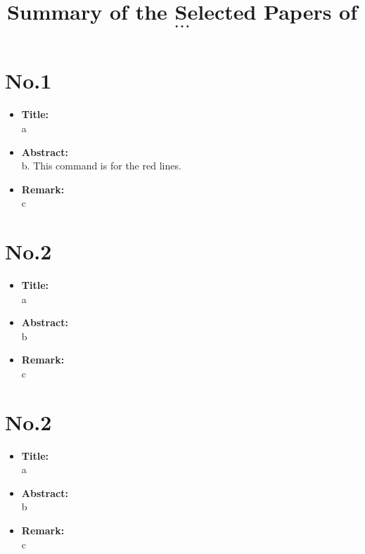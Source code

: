 \documentclass[12pt, onecolumn, draft]{IEEEtran}
\title{Summary of the Selected Papers of  \\ $\dots$ }
\begin{document}
\maketitle
\pagestyle{fancy}
\thispagestyle{firststyle}

\section*{\huge{No.1}}
\begin{itemize}
	\item \textbf{Title:} \\ a
	\item \textbf{Abstract:} \\ b. \textcolor[rgb]{1,0,0}{This command is for the red lines.}
	\item \textbf{Remark:} \\ c
\end{itemize}

\newpage
\section*{\huge{No.2}}
\begin{itemize}
	\item \textbf{Title:} \\ a
	\item \textbf{Abstract:} \\ b
	\item \textbf{Remark:} \\ c
\end{itemize}

\newpage
\section*{\huge{No.2}}
\begin{itemize}
	\item \textbf{Title:} \\ a
	\item \textbf{Abstract:} \\ b
	\item \textbf{Remark:} \\ c
\end{itemize}
\end{document}
